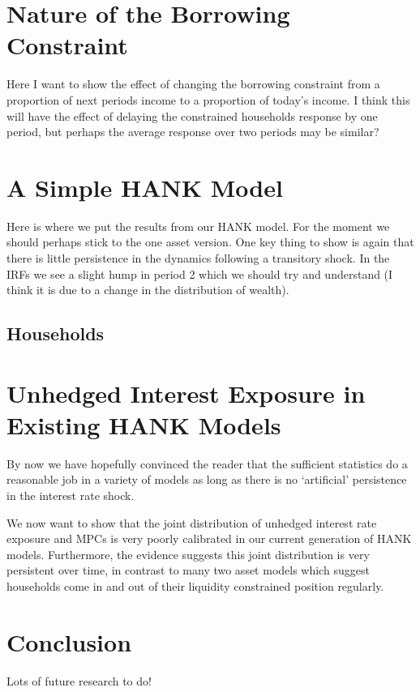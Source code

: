 \documentclass[titlepage]{\econtex}\newcommand{\texname}{ConsumptionHeterogeneity}
\begin{document}
\section{Nature of the Borrowing Constraint}
Here I want to show the effect of changing the borrowing constraint from a proportion of next periods income to a proportion of today's income. I think this will have the effect of delaying the constrained households response by one period, but perhaps the average response over two periods may be similar?

\section{A Simple HANK Model}
Here is where we put the results from our HANK model. For the moment we should perhaps stick to the one asset version. One key thing to show is again that there is little persistence in the dynamics following a transitory shock. In the IRFs we see a slight hump in period 2 which we should try and understand (I think it is due to a change in the distribution of wealth).

\subsection{Households}

\section{Unhedged Interest Exposure in Existing HANK Models}
By now we have hopefully convinced the reader that the sufficient statistics do a reasonable job in a variety of models as long as there is no `artificial' persistence in the interest rate shock.

We now want to show that the joint distribution of unhedged interest rate exposure and MPCs is very poorly calibrated in our current generation of HANK models. Furthermore, the evidence suggests this joint distribution is very persistent over time, in contrast to many two asset models which suggest households come in and out of their liquidity constrained position regularly.


\section{Conclusion}
Lots of future research to do!


\processdelayedfloats

\small

\normalsize
\end{document}
